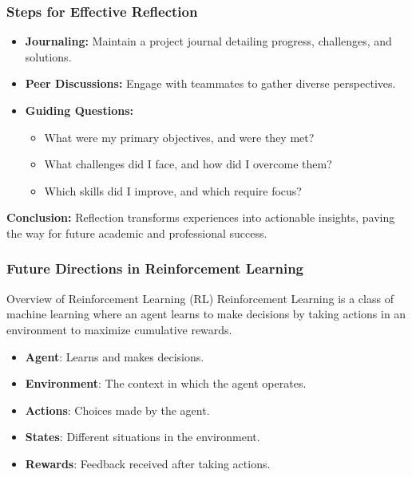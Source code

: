 \documentclass[aspectratio=169]{beamer}
\begin{document}
\begin{frame}[fragile]
    \frametitle{Steps for Effective Reflection}
    \begin{itemize}
        \item \textbf{Journaling:} Maintain a project journal detailing progress, challenges, and solutions.
        \item \textbf{Peer Discussions:} Engage with teammates to gather diverse perspectives.
        \item \textbf{Guiding Questions:}
            \begin{itemize}
                \item What were my primary objectives, and were they met?
                \item What challenges did I face, and how did I overcome them?
                \item Which skills did I improve, and which require focus?
            \end{itemize}
    \end{itemize}
    
    \textbf{Conclusion:} Reflection transforms experiences into actionable insights, paving the way for future academic and professional success.
\end{frame}

\begin{frame}[fragile]
    \frametitle{Future Directions in Reinforcement Learning}
    \begin{block}{Overview of Reinforcement Learning (RL)}
        Reinforcement Learning is a class of machine learning where an agent learns to make decisions by taking actions in an environment to maximize cumulative rewards.
    \end{block}
    \begin{itemize}
        \item \textbf{Agent}: Learns and makes decisions.
        \item \textbf{Environment}: The context in which the agent operates.
        \item \textbf{Actions}: Choices made by the agent.
        \item \textbf{States}: Different situations in the environment.
        \item \textbf{Rewards}: Feedback received after taking actions.
    \end{itemize}
\end{frame}
\end{document}
